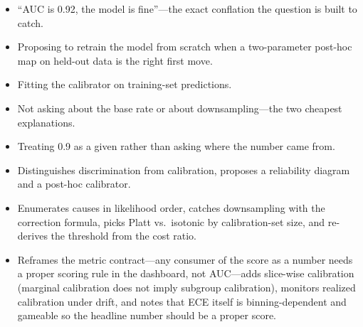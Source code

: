 \begin{interviewq}
\redflags
\begin{itemize}
    \item ``AUC is 0.92, the model is fine''---the exact conflation the question is built to catch.
    \item Proposing to retrain the model from scratch when a two-parameter post-hoc map on held-out data is the right first move.
    \item Fitting the calibrator on training-set predictions.
    \item Not asking about the base rate or about downsampling---the two cheapest explanations.
    \item Treating 0.9 as a given rather than asking where the number came from.
\end{itemize}


\goodgreat
\begin{itemize}
    \item {} Distinguishes discrimination from calibration, proposes a reliability diagram and a post-hoc calibrator.
    \item {} Enumerates causes in likelihood order, catches downsampling with the correction formula, picks Platt vs.\ isotonic by calibration-set size, and re-derives the threshold from the cost ratio.
    \item {} Reframes the metric contract---any consumer of the score as a number needs a proper scoring rule in the dashboard, not AUC---adds slice-wise calibration (marginal calibration does not imply subgroup calibration), monitors realized calibration under drift, and notes that ECE itself is binning-dependent and gameable so the headline number should be a proper score.
\end{itemize}

\end{interviewq}

